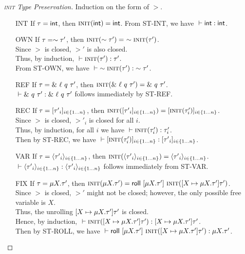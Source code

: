 \begin{proof}[\textsc{init} Type Preservation]
  Induction on the form of $\gt$.
  \begin{itemize}
    \item[INT]
      If $\tau = \mathsf{int}$, then $\textsc{init}({\mathsf{int}})=\mathsf{int}$.
      From \textsc{ST-INT}, we have ${} \vdash {\mathsf{int}} : {\mathsf{int}}$.
    \item[OWN]
      If $\tau = \sim{\tau'}$, then $\initShadow{\own{\gt'}}=\ \own{\initShadow{\gt'}}$. \\
      Since $\gt$ is closed, $\gt'$ is also closed. \\
      Thus, by induction, ${} \vdash {\textsc{init}({\tau'})} : {\tau'}$. \\
      From \textsc{ST-OWN}, we have ${} \vdash {\sim{\textsc{init}({\tau'})}} : {\sim{\tau'}}$.
    \item[REF]
      If $\tau = \&~{{\ell}~{q}~{\tau'}}$, 
      then $\textsc{init}({\&~{{\ell}~{q}~{\tau'}}})=\&~{{q}~{\tau'}}$. \\
      ${} \vdash {\&~{{q}~{\tau'}}} : {\&~{{\ell}~{q}~{\tau'}}}$ follows immediately by \textsc{ST-REF}.
    \item[REC]
      If $\tau = [{{\tau'}_{i}}]_{{i} \in \{1 \ldots {n}\} }$,
      then $\textsc{init}({[{{\tau'}_{i}}]_{{i} \in \{1 \ldots {n}\} }})=[\textsc{init}({\tau'_i})]_{i\in\{1\ldots n\}}$. \\
      Since $\gt$ is closed, $\gt'_i$ is closed for all $i$. \\
      Thus, by induction, for all $i$ we have ${} \vdash {\textsc{init}({\tau'_i})} : {\tau'_i}$. \\
      Then by \textsc{ST-REC}, we have 
      ${} \vdash {[\textsc{init}({\tau'_i})]_{i\in\{1\ldots n\}}} : {[{{\tau'}_{i}}]_{{i} \in \{1 \ldots {n}\} }}$.
    \item[VAR]
      If $\tau = \langle{{\tau'}_{i}}\rangle_{{i} \in \{1 \ldots {n}\} }$,
      then $\textsc{init}({\langle{{\tau'}_{i}}\rangle_{{i} \in \{1 \ldots {n}\} }})=\langle{{\tau'}_{i}}\rangle_{{i} \in \{1 \ldots {n}\} }$. \\
      ${} \vdash {\langle{{\tau'}_{i}}\rangle_{{i} \in \{1 \ldots {n}\} }} : {\langle{{\tau'}_{i}}\rangle_{{i} \in \{1 \ldots {n}\} }}$ follows immediately from \textsc{ST-VAR}.
    \item[FIX]
      If $\tau = \mu {X}.{\tau'}$,
      then $\textsc{init}({\mu {X}.{\tau'}}) 
         = \mathsf{roll}~[{\mu {X}.{\tau'}}]~{\textsc{init}({[{X} \mapsto {\mu {X}.{\tau'}}] {\tau'}})}$. \\
      Since $\gt$ is closed, $\gt'$ might not be closed;
      however, the only possible free variable is $X$. \\
      Thus, the unrolling $[{X} \mapsto {\mu {X}.{\tau'}}] {\tau'}$ is closed. \\
      Hence, by induction, 
      ${} \vdash {\textsc{init}({[{X} \mapsto {\mu {X}.{\tau'}}] {\tau'}})} : {[{X} \mapsto {\mu {X}.{\tau'}}] {\tau'}}$. \\
      Then by \textsc{ST-ROLL}, we have
      ${} \vdash {\mathsf{roll}~[{\mu {X}.{\tau'}}]~{\textsc{init}({[{X} \mapsto {\mu {X}.{\tau'}}] {\tau'}})}} : {\mu {X}.{\tau'}}$.
  \end{itemize}
\end{proof}

